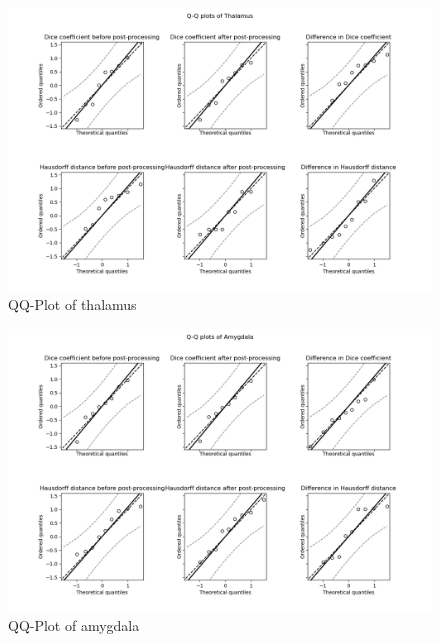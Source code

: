 \documentclass[journal]{IEEEtran}
\begin{document}
\begin{figure}[ht]
\centering
\includegraphics[width=5.6in]{img/QQ_plots_PKF/Thalamus.png}
\caption{QQ-Plot of thalamus}
\label{fig_qq_t}
\end{figure}

\begin{figure}[ht!]
\centering
\includegraphics[width=5.6in]{img/QQ_plots_PKF/Amygdala.png}
\caption{QQ-Plot of amygdala}
\label{fig_qq_a}
\end{figure}


\ifCLASSOPTIONcaptionsoff
  \newpage
\fi



\end{document}
